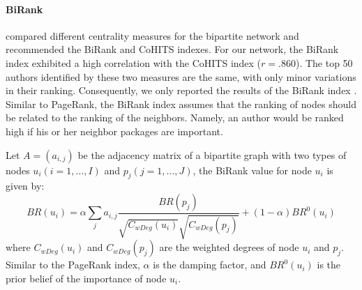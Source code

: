\paragraph{BiRank}
\citet{aronson2020comparing} compared different centrality measures for the bipartite network and recommended the BiRank and CoHITS indexes. For our network, the BiRank index exhibited a high correlation with the CoHITS index ($r=.860$). The top 50 authors identified by these two measures are the same, with only minor variations in their ranking. Consequently, we only reported the results of the BiRank index \citep{he2016birank}.  Similar to PageRank, the BiRank index assumes that the ranking of nodes should be related to the ranking of the neighbors. Namely, an author would be ranked high if his or her neighbor packages are important.


Let $A = (a_{i,j})$ be the adjacency matrix of a bipartite graph with two types of nodes $u_i (i = 1, \ldots, I)$ and $p_j (j = 1, \ldots, J)$, the BiRank value for node $u_i$ is given by:
\begin{equation}
BR(u_i) = \alpha \sum_{j}a_{i,j}\frac{BR(p_j)}{\sqrt{C_{wDeg}(u_i)} \sqrt{C_{wDeg}(p_j)}} + (1-\alpha)BR^0(u_i)
\end{equation}
where $C_{wDeg}(u_i)$ and $C_{wDeg}(p_j)$ are the weighted degrees of node $u_i$ and $p_j$. %
Similar to the PageRank index, $\alpha$ is the damping factor, and $BR^0(u_i)$ is the prior belief of the importance of node $u_i$. 




